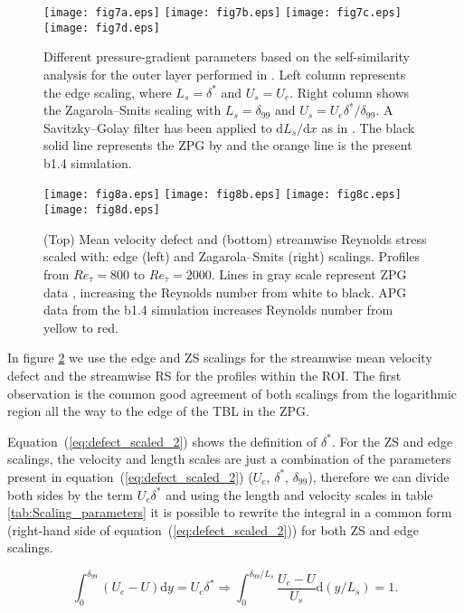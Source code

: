 \begin{figure}
\texttt{[image: fig7a.eps]}
\texttt{[image: fig7b.eps]}
\texttt{[image: fig7c.eps]}
\texttt{[image: fig7d.eps]}
\caption{Different pressure-gradient parameters based on the self-similarity analysis for the outer layer performed in \citet{Gibis2019}. Left column represents the edge scaling, where $L_s=\delta^*$ and $U_s=U_e$. Right column shows the Zagarola--Smits scaling with $L_s=\delta_{99}$ and $U_s=U_{e}\delta^*/\delta_{99}$. A Savitzky--Golay filter has been applied to $\textrm{d} L_s/\textrm{d}x$ as in \cite{Gibis2019}. The black solid line represents the ZPG by \cite{E-AmorZPG} and the orange line is the present b1.4 simulation.}
\label{fig:pg_parameters}
\end{figure}

\begin{figure} 
\texttt{[image: fig8a.eps]}
\texttt{[image: fig8b.eps]}
\texttt{[image: fig8c.eps]}
\texttt{[image: fig8d.eps]}
\caption{(Top) Mean velocity defect and (bottom) streamwise Reynolds stress scaled with: edge (left) and Zagarola--Smits (right) scalings. Profiles from $Re_{\tau}=800$ to $Re_{\tau}=2000$. Lines in gray scale represent ZPG data \citep{E-AmorZPG}, increasing the Reynolds number from white to black. APG data from the b1.4 simulation increases Reynolds number from yellow to red.}
\label{fig:def_U_uu}
\end{figure}

In figure \ref{fig:def_U_uu} we use the edge and ZS scalings for the streamwise mean velocity defect and the streamwise RS for the profiles within the ROI.
The first observation is the common good agreement of both scalings from the logarithmic region all the way to the edge of the TBL in the ZPG.

Equation~(\ref{eq:defect_scaled_2}) shows the definition of $\delta^*$. For the ZS and edge scalings, the velocity and length scales are just a combination of the parameters present in equation~(\ref{eq:defect_scaled_2}) ($U_e$, $\delta^*$, $\delta_{99}$), therefore we can divide both sides by the term $U_e \delta^*$ and using the length and velocity scales in table \ref{tab:Scaling_parameters} it is possible to rewrite the integral in a common form (right-hand side of equation~(\ref{eq:defect_scaled_2})) for both ZS and edge scalings.

\begin{equation}\label{eq:defect_scaled_2}
    \int_{0}^{\delta_{99}} (U_e-U) \textrm{d} y = U_e \delta^*  \Rightarrow \int_{0}^{\delta_{99}/L_s} \frac{U_e-U}{U_s} \textrm{d}(y/L_s)=1. 
\end{equation}


